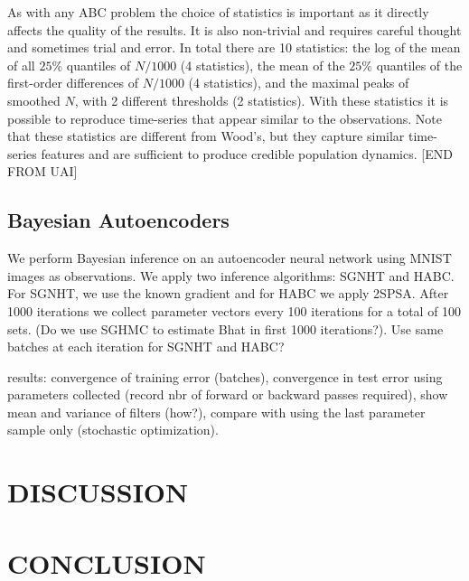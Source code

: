 \documentclass[]{article}
\begin{document}
As with any ABC problem the choice of statistics is important as it directly affects the quality of the results.   It is also non-trivial and requires careful thought and sometimes trial and error.   In total there are 10 statistics: the log of the mean of all $25\%$ quantiles of $N/1000$ (4 statistics), the mean of the $25\%$ quantiles of the first-order differences of $N/1000$ (4 statistics), and the maximal peaks of smoothed $N$, with 2 different thresholds (2 statistics).    With these statistics it is possible to reproduce time-series that appear similar to the observations.  Note that these statistics are different from Wood's, but they capture similar time-series features and are sufficient to produce credible population dynamics. [END FROM UAI]


\subsection{Bayesian Autoencoders}\label{sec:auto}
We perform Bayesian inference on an autoencoder neural network using MNIST images as observations.  We apply two inference algorithms: SGNHT and HABC.  For SGNHT, we use the known gradient and for HABC we apply 2SPSA.  After 1000 iterations we collect parameter vectors every 100 iterations for a total of 100 sets. (Do we use SGHMC to estimate Bhat in first 1000 iterations?).  Use same batches at each iteration for SGNHT and HABC? 

results: convergence of training error (batches), convergence in test error using parameters collected (record nbr of forward or backward passes required), show mean and variance of filters (how?), compare with using the last parameter sample only (stochastic optimization).





\section{DISCUSSION} \label{sec:discussion}


\section{CONCLUSION} \label{sec:conclusion}
\end{document}
